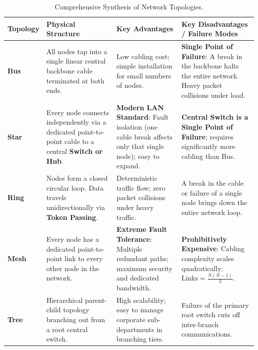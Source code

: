 \begin{table}[htbp]
\centering
\footnotesize
\renewcommand{\arraystretch}{1.3}
\begin{tabularx}{\linewidth}{l>{\raggedright\arraybackslash}X>{\raggedright\arraybackslash}X>{\raggedright\arraybackslash}X}
\toprule
\textbf{Topology} & \textbf{Physical Structure} & \textbf{Key Advantages} & \textbf{Key Disadvantages / Failure Modes} \\
\midrule
\textbf{Bus} & All nodes tap into a single linear central backbone cable terminated at both ends. & Low cabling cost; simple installation for small numbers of nodes. & \textbf{Single Point of Failure}: A break in the backbone halts the entire network. Heavy packet collisions under load. \\
\textbf{Star} & Every node connects independently via a dedicated point-to-point cable to a central \textbf{Switch or Hub}. & \textbf{Modern LAN Standard}: Fault isolation (one cable break affects only that single node); easy to expand. & \textbf{Central Switch is a Single Point of Failure}; requires significantly more cabling than Bus. \\
\textbf{Ring} & Nodes form a closed circular loop. Data travels unidirectionally via \textbf{Token Passing}. & Deterministic traffic flow; zero packet collisions under heavy traffic. & A break in the cable or failure of a single node brings down the entire network loop. \\
\textbf{Mesh} & Every node has a dedicated point-to-point link to every other node in the network. & \textbf{Extreme Fault Tolerance}: Multiple redundant paths; maximum security and dedicated bandwidth. & \textbf{Prohibitively Expensive}: Cabling complexity scales quadratically: $\text{Links} = \frac{N(N-1)}{2}$. \\
\textbf{Tree} & Hierarchical parent-child topology branching out from a root central switch. & High scalability; easy to manage corporate sub-departments in branching tiers. & Failure of the primary root switch cuts off inter-branch communications. \\
\bottomrule
\end{tabularx}
\caption{Comprehensive Synthesis of Network Topologies.}
\label{tab:network-topologies-master}
\end{table}

